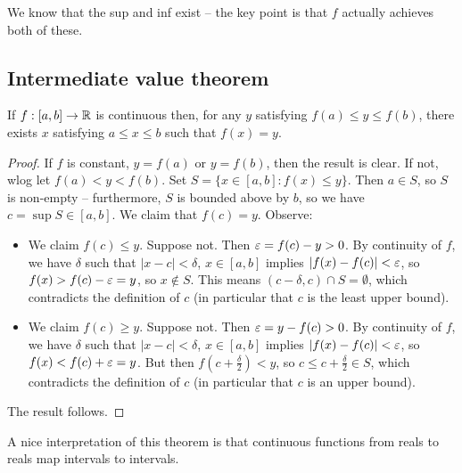 \documentclass{../../template/note}
\begin{document}
    \begin{remark*}
        We know that the sup and inf exist -- the key point is that \(f\) actually achieves both of these.
    \end{remark*}
    
    \subsection{Intermediate value theorem}
    
    \begin{theorem}
        \label{ivt}
        If \(f: [a, b] \to \mathbb R\) is continuous then, for any \(y\) satisfying \(f(a) \leq y \leq f(b)\), there exists \(x\) satisfying \(a \leq x \leq b\) such that \(f(x) = y\).
    \end{theorem}
    
    \begin{proof}
        If \(f\) is constant, \(y=f(a)\) or \(y=f(b)\), then the result is clear. If not, wlog let \(f(a) < y < f(b)\). Set \(S = \{x \in [a, b]: f(x) \leq y\}\). Then \(a \in S\), so \(S\) is non-empty -- furthermore, \(S\) is bounded above by \(b\), so we have \(c = \sup S \in [a, b]\). We claim that \(f(c) = y\). Observe:
        \begin{itemize}
            \item We claim \(f(c) \leq y\). Suppose not. Then \(\varepsilon = f(c) - y > 0\). By continuity of \(f\), we have \(\delta\) such that \(|x-c| < \delta\), \(x \in [a, b]\) implies \(|f(x) - f(c)| < \varepsilon\), so \(f(x) > f(c) - \varepsilon = y\), so \(x \notin S\). This means \((c - \delta, c) \cap S = \emptyset\), which contradicts the definition of \(c\) (in particular that \(c\) is the least upper bound).
            \item We claim \(f(c) \geq y\). Suppose not. Then \(\varepsilon = y - f(c) > 0\). By continuity of \(f\), we have \(\delta\) such that \(|x-c| < \delta\), \(x \in [a, b]\) implies \(|f(x) - f(c)| < \varepsilon\), so \(f(x) < f(c) + \varepsilon = y\). But then \(f(c + \frac{\delta}2) < y\), so \(c \leq c + \frac{\delta}2 \in S\), which contradicts the definition of \(c\) (in particular that \(c\) is an upper bound).
        \end{itemize}
        The result follows.        
    \end{proof}
    
    \begin{remark*}
        A nice interpretation of this theorem is that continuous functions from reals to reals map intervals to intervals.
    \end{remark*}
    
\end{document}
